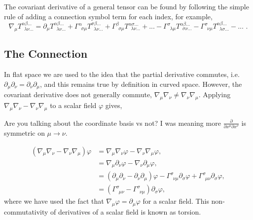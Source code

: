 The covariant derivative of a general tensor can be found by following the simple rule of adding a connection symbol term for each index, for example,
\begin{equation}
\nabla_\mu T^{\alpha\beta ...}_{\,\,\,\lambda\nu ...} = \partial_\mu T^{\alpha\beta ...}_{\,\,\,\lambda\nu ...} 
+ \Gamma^{\alpha}_{\,\,\,\sigma \mu} T^{\sigma\beta ...}_{\,\,\,\lambda\nu ...} + \Gamma^{\beta}_{\,\,\,\sigma\mu} T^{\alpha\sigma ...}_{\,\,\,\lambda\nu ...} + ...
- \Gamma^{\sigma}_{\,\,\,\lambda\mu} T^{\alpha\beta ...}_{\,\,\,\sigma\nu ...} - \Gamma^{\sigma}_{\,\,\,\nu\mu} T^{\alpha\beta ...}_{\,\,\,\lambda\sigma ...} - ...
\,\,.\end{equation}



\subsection{The Connection}\label{intro:sec:levicivita}

In flat space we are used to the idea that the partial derivative commutes, i.e. $\partial_\mu \partial_\nu = \partial_\nu \partial_\mu$, and this remains true by definition in curved space. However, the covariant derivative does not generally commute, $\nabla_\mu \nabla_\nu \neq \nabla_\nu \nabla_\mu$. Applying $\nabla_\mu \nabla_\nu - \nabla_\nu \nabla_\mu$ to a scalar field $\varphi$ gives,

\color{choral} Are you talking about the coordinate basis vs not? I was meaning more $\frac{\partial}{\partial x^\mu \partial x^\nu}$ is symmetric on $\mu \rightarrow \nu$.    \color{black}

\begin{align}
(\nabla_\mu \nabla_\nu  - \nabla_\nu \nabla_\mu )\varphi &= \nabla_\mu \nabla_\nu \varphi - \nabla_\nu \nabla_\mu \varphi , \\
                                               &= \nabla_\mu \partial_\nu \varphi - \nabla_\nu \partial_\mu \varphi , \\
                                               &= (\partial_\mu \partial_\nu  - \partial_\nu \partial_\mu )\varphi -  \Gamma^{\sigma}_{\,\,\,\nu\mu} \partial_\sigma \varphi + \Gamma^{\sigma}_{\,\,\,\mu\nu} \partial_\sigma \varphi,\\ 
                                               &=(\Gamma^{\sigma}_{\,\,\,\mu\nu}  - \Gamma^{\sigma}_{\,\,\,\nu\mu}) \partial_\sigma \varphi, 
\end{align}
where we have used the fact that $\nabla_\mu \varphi = \partial_\mu \varphi$ for a scalar field. This non-commutativity of derivatives of a scalar field is known as torsion. 

